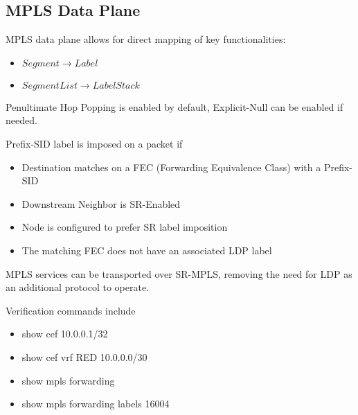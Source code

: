 \subsection{MPLS Data Plane}
MPLS data plane allows for direct mapping of key functionalities:

\begin{itemize}
    \item $Segment \rightarrow Label$
    \item $Segment List \rightarrow Label Stack$
\end{itemize}

\noindent
Penultimate Hop Popping is enabled by default,
Explicit-Null can be enabled if needed.

\vspace{5mm}
\noindent
Prefix-SID label is imposed on a packet if
\begin{itemize}
    \item Destination matches on a FEC (Forwarding Equivalence Class) with a Prefix-SID
    \item Downstream Neighbor is SR-Enabled
    \item Node is configured to prefer SR label imposition
    \item The matching FEC does not have an associated LDP label
\end{itemize} 

\noindent
MPLS services can be transported over SR-MPLS, removing the need for LDP as an additional protocol to operate.  

\vspace{5mm}
\noindent
Verification commands include
\ttfamily
\begin{itemize}
    \item show cef 10.0.0.1/32
    \item show cef vrf RED 10.0.0.0/30
    \item show mpls forwarding
    \item show mpls forwarding labels 16004 
\end{itemize}
\rmfamily